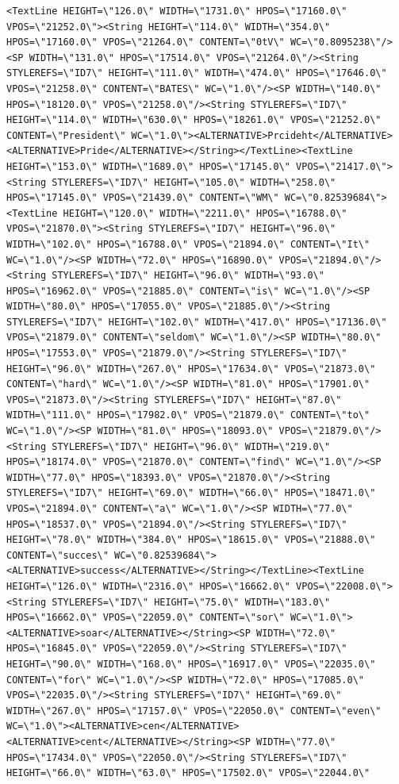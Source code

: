 \documentclass[]{gitbook}
\begin{document}
\begin{verbatim}
<TextLine HEIGHT=\"126.0\" WIDTH=\"1731.0\" HPOS=\"17160.0\" VPOS=\"21252.0\"><String HEIGHT=\"114.0\" WIDTH=\"354.0\" HPOS=\"17160.0\" VPOS=\"21264.0\" CONTENT=\"0tV\" WC=\"0.8095238\"/><SP WIDTH=\"131.0\" HPOS=\"17514.0\" VPOS=\"21264.0\"/><String STYLEREFS=\"ID7\" HEIGHT=\"111.0\" WIDTH=\"474.0\" HPOS=\"17646.0\" VPOS=\"21258.0\" CONTENT=\"BATES\" WC=\"1.0\"/><SP WIDTH=\"140.0\" HPOS=\"18120.0\" VPOS=\"21258.0\"/><String STYLEREFS=\"ID7\" HEIGHT=\"114.0\" WIDTH=\"630.0\" HPOS=\"18261.0\" VPOS=\"21252.0\" CONTENT=\"President\" WC=\"1.0\"><ALTERNATIVE>Prcideht</ALTERNATIVE><ALTERNATIVE>Pride</ALTERNATIVE></String></TextLine><TextLine HEIGHT=\"153.0\" WIDTH=\"1689.0\" HPOS=\"17145.0\" VPOS=\"21417.0\"><String STYLEREFS=\"ID7\" HEIGHT=\"105.0\" WIDTH=\"258.0\" HPOS=\"17145.0\" VPOS=\"21439.0\" CONTENT=\"WM\" WC=\"0.82539684\"><TextLine HEIGHT=\"120.0\" WIDTH=\"2211.0\" HPOS=\"16788.0\" VPOS=\"21870.0\"><String STYLEREFS=\"ID7\" HEIGHT=\"96.0\" WIDTH=\"102.0\" HPOS=\"16788.0\" VPOS=\"21894.0\" CONTENT=\"It\" WC=\"1.0\"/><SP WIDTH=\"72.0\" HPOS=\"16890.0\" VPOS=\"21894.0\"/><String STYLEREFS=\"ID7\" HEIGHT=\"96.0\" WIDTH=\"93.0\" HPOS=\"16962.0\" VPOS=\"21885.0\" CONTENT=\"is\" WC=\"1.0\"/><SP WIDTH=\"80.0\" HPOS=\"17055.0\" VPOS=\"21885.0\"/><String STYLEREFS=\"ID7\" HEIGHT=\"102.0\" WIDTH=\"417.0\" HPOS=\"17136.0\" VPOS=\"21879.0\" CONTENT=\"seldom\" WC=\"1.0\"/><SP WIDTH=\"80.0\" HPOS=\"17553.0\" VPOS=\"21879.0\"/><String STYLEREFS=\"ID7\" HEIGHT=\"96.0\" WIDTH=\"267.0\" HPOS=\"17634.0\" VPOS=\"21873.0\" CONTENT=\"hard\" WC=\"1.0\"/><SP WIDTH=\"81.0\" HPOS=\"17901.0\" VPOS=\"21873.0\"/><String STYLEREFS=\"ID7\" HEIGHT=\"87.0\" WIDTH=\"111.0\" HPOS=\"17982.0\" VPOS=\"21879.0\" CONTENT=\"to\" WC=\"1.0\"/><SP WIDTH=\"81.0\" HPOS=\"18093.0\" VPOS=\"21879.0\"/><String STYLEREFS=\"ID7\" HEIGHT=\"96.0\" WIDTH=\"219.0\" HPOS=\"18174.0\" VPOS=\"21870.0\" CONTENT=\"find\" WC=\"1.0\"/><SP WIDTH=\"77.0\" HPOS=\"18393.0\" VPOS=\"21870.0\"/><String STYLEREFS=\"ID7\" HEIGHT=\"69.0\" WIDTH=\"66.0\" HPOS=\"18471.0\" VPOS=\"21894.0\" CONTENT=\"a\" WC=\"1.0\"/><SP WIDTH=\"77.0\" HPOS=\"18537.0\" VPOS=\"21894.0\"/><String STYLEREFS=\"ID7\" HEIGHT=\"78.0\" WIDTH=\"384.0\" HPOS=\"18615.0\" VPOS=\"21888.0\" CONTENT=\"succes\" WC=\"0.82539684\"><ALTERNATIVE>success</ALTERNATIVE></String></TextLine><TextLine HEIGHT=\"126.0\" WIDTH=\"2316.0\" HPOS=\"16662.0\" VPOS=\"22008.0\"><String STYLEREFS=\"ID7\" HEIGHT=\"75.0\" WIDTH=\"183.0\" HPOS=\"16662.0\" VPOS=\"22059.0\" CONTENT=\"sor\" WC=\"1.0\"><ALTERNATIVE>soar</ALTERNATIVE></String><SP WIDTH=\"72.0\" HPOS=\"16845.0\" VPOS=\"22059.0\"/><String STYLEREFS=\"ID7\" HEIGHT=\"90.0\" WIDTH=\"168.0\" HPOS=\"16917.0\" VPOS=\"22035.0\" CONTENT=\"for\" WC=\"1.0\"/><SP WIDTH=\"72.0\" HPOS=\"17085.0\" VPOS=\"22035.0\"/><String STYLEREFS=\"ID7\" HEIGHT=\"69.0\" WIDTH=\"267.0\" HPOS=\"17157.0\" VPOS=\"22050.0\" CONTENT=\"even\" WC=\"1.0\"><ALTERNATIVE>cen</ALTERNATIVE><ALTERNATIVE>cent</ALTERNATIVE></String><SP WIDTH=\"77.0\" HPOS=\"17434.0\" VPOS=\"22050.0\"/><String STYLEREFS=\"ID7\" HEIGHT=\"66.0\" WIDTH=\"63.0\" HPOS=\"17502.0\" VPOS=\"22044.0\"
\end{verbatim}
\end{document}
